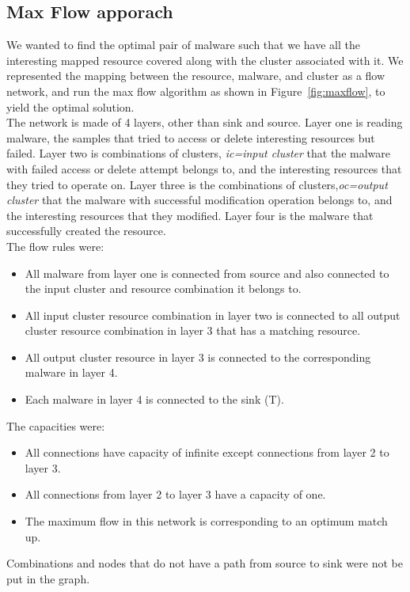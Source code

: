 \subsection{Max Flow apporach}
\label{sub:Max Flow apporach}
We wanted to find the optimal pair of malware such that we have all the interesting mapped resource covered along with the cluster associated with it.
We represented the mapping between the resource, malware, and cluster as a flow network, and run the max flow algorithm as shown in Figure~\ref{fig:maxflow}, to yield the optimal solution.\\
The network is made of 4 layers, other than sink and source. Layer one is reading malware, the samples that tried to access or delete interesting resources but failed.
Layer two is combinations of clusters, \emph{ic=input cluster} that the malware with failed access or delete attempt belongs to, and the interesting resources that they tried to operate on.
Layer three is the combinations of clusters,\emph{oc=output cluster} that the malware with successful modification operation belongs to, and the interesting resources that they modified.
Layer four is the malware that successfully created the resource.\\
The flow rules were:
\begin{itemize}
  \item All malware from layer one is connected from source and also connected to the input cluster and resource combination it belongs to.
  \item All input cluster resource combination in layer two is connected to all output cluster resource combination in layer 3 that has a matching resource.
  \item All output cluster resource in layer 3 is connected to the corresponding malware in layer 4.
  \item Each malware in layer 4 is connected to the sink (T).
\end{itemize}
The capacities were:
\begin{itemize}
  \item All connections have capacity of infinite except connections from layer 2 to layer 3.
  \item All connections from layer 2 to layer 3 have a capacity of one.
  \item The maximum flow in this network is corresponding to an optimum match up.
\end{itemize}
Combinations and nodes that do not have a path from source to sink were not be put in the graph.\\
